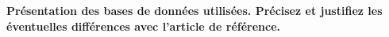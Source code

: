 \textbf{Présentation des bases de données utilisées. Précisez et justifiez les éventuelles différences avec l’article de référence.}\\

